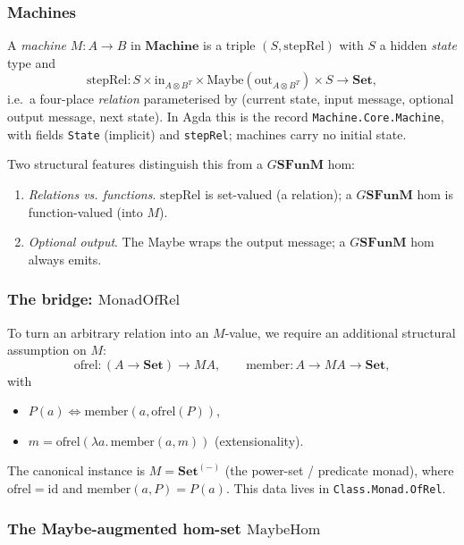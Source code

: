 \documentclass[11pt]{article}
\newcommand{\Set}{\mathbf{Set}}
\newcommand{\SFunM}{\mathbf{SFunM}}
\newcommand{\id}{\mathrm{id}}
\newcommand{\stepRel}{\mathrm{stepRel}}
\newcommand{\Machine}{\mathbf{Machine}}
\newcommand{\Maybe}{\mathrm{Maybe}}
\begin{document}
\subsubsection{Machines}

A \emph{machine} $M : A \to B$ in $\Machine$ is a triple
$(S, \stepRel)$ with $S$ a hidden \emph{state} type and
\[
  \stepRel : S \times \mathrm{in}_{A \otimes B^T} \times
             \Maybe(\mathrm{out}_{A \otimes B^T}) \times S \to \Set,
\]
i.e.\ a four-place \emph{relation} parameterised by (current state,
input message, optional output message, next state).  In Agda this
is the record \texttt{Machine.Core.Machine}, with fields
\texttt{State} (implicit) and \texttt{stepRel}; machines carry no
initial state.

Two structural features distinguish this from a $G\SFunM$ hom:
\begin{enumerate}
  \item[(R)] \emph{Relations vs. functions}.  $\stepRel$ is set-valued
       (a relation); a $G\SFunM$ hom is function-valued (into $M$).
  \item[(O)] \emph{Optional output}.  The $\Maybe$ wraps the output
       message; a $G\SFunM$ hom always emits.
\end{enumerate}

\subsubsection{The bridge: $\mathrm{MonadOfRel}$}\label{sec:MonadOfRel}

To turn an arbitrary relation into an $M$-value, we require an
additional structural assumption on $M$:
\[
  \mathrm{ofrel} : (A \to \Set) \to MA, \qquad
  \mathrm{member} : A \to MA \to \Set,
\]
with
\begin{itemize}
  \item $P(a) \iff \mathrm{member}(a, \mathrm{ofrel}(P))$,
  \item $m = \mathrm{ofrel}(\lambda a.\, \mathrm{member}(a, m))$ (extensionality).
\end{itemize}
The canonical instance is $M = \Set^{(-)}$ (the power-set / predicate
monad), where $\mathrm{ofrel} = \id$ and $\mathrm{member}(a, P) = P(a)$.
This data lives in \texttt{Class.Monad.OfRel}.

\subsubsection{The Maybe-augmented hom-set $\mathrm{MaybeHom}$}
\end{document}
